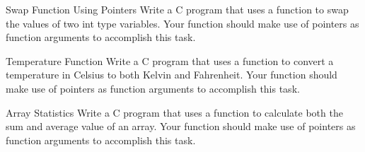 \documentclass{pass}
\begin{document}
\begin{task}{Swap Function Using Pointers}{}
Write a C program that uses a function to swap the values of two int type variables. Your function should make use of pointers as function arguments to accomplish this task.
\end{task}

\begin{task}{Temperature Function}{}
Write a C program that uses a function to convert a temperature in Celsius to both Kelvin and Fahrenheit. Your function should make use of pointers as function arguments to accomplish this task.
\\[8pt]
\end{task}

\begin{task}{Array Statistics}{}
Write a C program that uses a function to calculate both the sum and average value of an array. Your function should make use of pointers as function arguments to accomplish this task.
\end{task}
\end{document}
